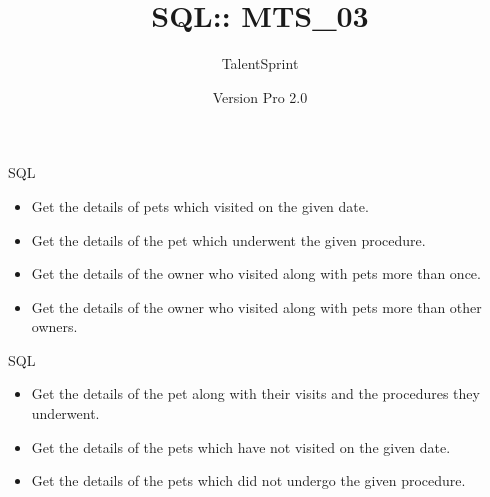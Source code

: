 \documentclass[14pt]{beamer}
\title[BPT:VCS:01]{SQL:: MTS\_03}
\author[TS]{TalentSprint}
\institute[L\&D]{Licensed To Skill}
\date{Version Pro 2.0}
\begin{document}
\begin{frame}
  \titlepage
\end{frame}

\begin{frame}{SQL}
 \begin{itemize}
  \item Get the details of pets which visited on the given date.
  \item Get the details of the pet which underwent the given procedure.
  \item Get the details of the owner who visited along with pets more than once.
  \item Get the details of the owner who visited along with pets more than other owners.
 \end{itemize}
\end{frame}

\begin{frame}{SQL}
 \begin{itemize}
  \item Get the details of the pet along with their visits and the procedures they underwent.
  \item Get the details of the pets which have not visited on the given date.
  \item Get the details of the pets which did not undergo the given procedure.
 \end{itemize}
\end{frame}
\end{document}

